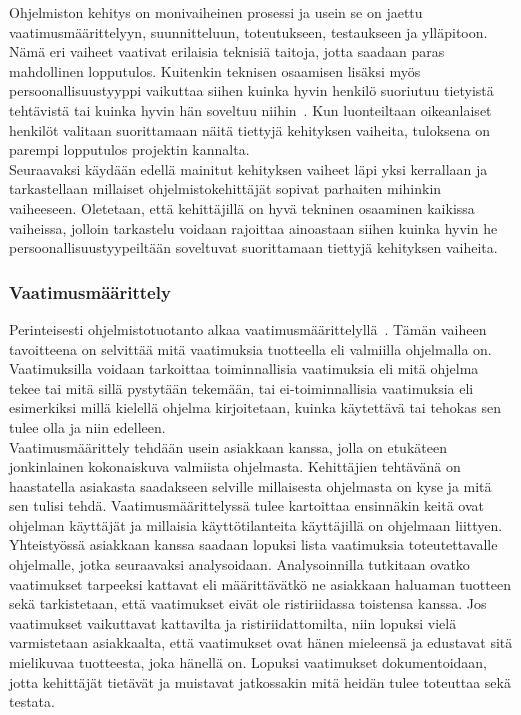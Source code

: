 \documentclass[finnish]{../tktltiki2}
\theoremstyle{definition}
\theoremstyle{remark}
\begin{document}
Ohjelmiston kehitys on monivaiheinen prosessi ja usein se on
jaettu vaatimusmäärittelyyn, suunnitteluun, toteutukseen, testaukseen
ja ylläpitoon. Nämä eri vaiheet vaativat erilaisia teknisiä taitoja,
jotta saadaan paras mahdollinen lopputulos. Kuitenkin teknisen
osaamisen lisäksi myös persoonallisuustyyppi vaikuttaa siihen kuinka
hyvin henkilö suoriutuu tietyistä tehtävistä tai kuinka hyvin hän
soveltuu niihin~\cite{Capretz:2010:MSS:1726559.1726574}. Kun luonteiltaan oikeanlaiset henkilöt valitaan suorittamaan
näitä tiettyjä kehityksen vaiheita, tuloksena on parempi lopputulos
projektin kannalta.\\

Seuraavaksi käydään edellä mainitut kehityksen vaiheet läpi yksi kerrallaan
ja tarkastellaan millaiset ohjelmistokehittäjät sopivat
parhaiten mihinkin vaiheeseen. Oletetaan, että kehittäjillä on
hyvä tekninen osaaminen kaikissa vaiheissa, jolloin tarkastelu
voidaan rajoittaa ainoastaan siihen kuinka hyvin he persoonallisuustyypeiltään soveltuvat suorittamaan tiettyjä
kehityksen vaiheita.

\subsubsection{Vaatimusmäärittely}

Perinteisesti ohjelmistotuotanto alkaa vaatimusmäärittelyllä~\cite{SWEBOK:409902,Sommerville:2005:IRE:1042197.1042341}. Tämän vaiheen tavoitteena on selvittää mitä vaatimuksia
tuotteella eli valmiilla ohjelmalla on. Vaatimuksilla voidaan tarkoittaa toiminnallisia vaatimuksia eli
mitä ohjelma tekee tai mitä sillä pystytään tekemään, tai ei-toiminnallisia vaatimuksia eli esimerkiksi millä kielellä
ohjelma kirjoitetaan, kuinka käytettävä tai tehokas sen tulee olla ja niin edelleen.\\

Vaatimusmäärittely tehdään usein asiakkaan kanssa, jolla on etukäteen jonkinlainen kokonaiskuva valmiista ohjelmasta.
Kehittäjien tehtävänä on haastatella asiakasta saadakseen selville millaisesta ohjelmasta on kyse ja mitä sen tulisi tehdä.
Vaatimusmäärittelyssä tulee kartoittaa ensinnäkin keitä ovat ohjelman käyttäjät ja millaisia käyttötilanteita
käyttäjillä on ohjelmaan liittyen. Yhteistyössä asiakkaan kanssa saadaan lopuksi lista vaatimuksia toteutettavalle ohjelmalle,
jotka seuraavaksi analysoidaan. Analysoinnilla tutkitaan ovatko vaatimukset tarpeeksi kattavat eli määrittävätkö ne asiakkaan
haluaman tuotteen sekä tarkistetaan, että vaatimukset eivät ole ristiriidassa toistensa kanssa. Jos vaatimukset vaikuttavat
kattavilta ja ristiriidattomilta, niin lopuksi vielä varmistetaan asiakkaalta, että vaatimukset ovat hänen mieleensä ja
edustavat sitä mielikuvaa tuotteesta, joka hänellä on.
Lopuksi vaatimukset dokumentoidaan, jotta kehittäjät tietävät ja muistavat jatkossakin mitä heidän tulee toteuttaa sekä testata.\\
\end{document}
